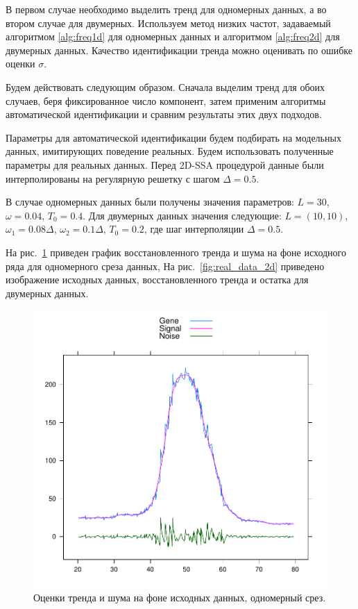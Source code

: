 \documentclass[specialist,
               substylefile = spbu.rtx,
               subf,href,colorlinks=true, 12pt]{disser}
\begin{document}
В первом случае необходимо выделить тренд для одномерных данных, а во втором случае для двумерных.
Используем метод низких частот, задаваемый алгоритмом \ref{alg:freq1d} для одномерных данных и алгоритмом \ref{alg:freq2d} для двумерных данных.
Качество идентификации тренда можно оценивать по ошибке оценки $\sigma$.

Будем действовать следующим образом. Сначала выделим тренд для обоих случаев, беря фиксированное число компонент, затем применим алгоритмы автоматической идентификации и сравним результаты этих двух подходов.

Параметры для автоматической идентификации будем подбирать на модельных данных,
имитирующих поведение реальных. Будем использовать полученные параметры для реальных данных.
Перед 2D-SSA процедурой данные были интерполированы на регулярную решетку с шагом $\Delta = 0.5$.

В случае одномерных данных были получены значения параметров: $L=30$, $\omega=0.04$, $T_0=0.4$.
Для двумерных данных значения следующие:  $L=(10,10)$, $\omega_{1}=0.08 \Delta$,
  $\omega_{2}=0.1 \Delta$, $T_0=0.2$, где шаг интерполяции $\Delta = 0.5$.

На рис.~\ref{fig:real_data_1d} приведен график восстановленного тренда и шума на фоне исходного ряда для одномерного среза данных, 
На рис.~\ref{fig:real_data_2d} приведено изображение исходных данных, восстановленного тренда и остатка для двумерных данных. 

\begin{figure}[!hhh]
	\begin{center}
	\includegraphics[scale=0.5]{real_data_trend_noise0}
	\end{center}
	\caption{Оценки тренда и шума на фоне исходных данных, одномерный срез.}
	\label{fig:real_data_1d}
\end{figure}
\end{document}
